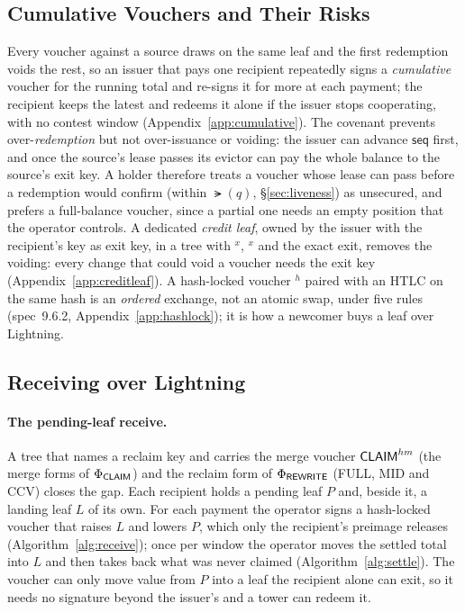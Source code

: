 \subsection{Cumulative Vouchers and Their Risks}\label{sec:cumulative}

Every voucher against a source draws on the same leaf and the first
redemption voids the rest, so an issuer that pays one recipient repeatedly
signs a \emph{cumulative} voucher for the running total and re-signs it for
more at each payment; the recipient keeps the latest and redeems it alone
if the issuer stops cooperating, with no contest window
(Appendix~\ref{app:cumulative}).\label{sec:holder-risk} The covenant
prevents over-\emph{redemption} but not over-issuance or voiding: the
issuer can advance $\mathsf{seq}$ first, and once the source's lease
passes its evictor can pay the whole balance to the source's exit key. A
holder therefore treats a voucher whose lease can pass before a redemption
would confirm (within $\lat(q)$, \S\ref{sec:liveness}) as unsecured, and
prefers a full-balance voucher, since a partial one needs an empty
position that the operator controls.\label{sec:creditleaf} A dedicated
\emph{credit leaf}, owned by the issuer with the recipient's key as exit
key, in a tree with $^{x}$, $^{x}$ and the exact
exit, removes the voiding: every change that could void a voucher needs
the exit key (Appendix~\ref{app:creditleaf}).\label{sec:hashlock} A
hash-locked voucher $^{h}$ paired with an HTLC on the same hash
is an \emph{ordered} exchange, not an atomic swap, under five rules
(spec~9.6.2, Appendix~\ref{app:hashlock}); it is how a newcomer buys a leaf
over Lightning.

\subsection{Receiving over Lightning}\label{sec:receive-short}



\paragraph{The pending-leaf receive.} A tree that names a reclaim
key and carries the merge voucher $\textsf{CLAIM}^{hm}$ (the merge forms of
$\Phi_{\textsf{CLAIM}}$) and the reclaim form of $\Phi_{\textsf{REWRITE}}$ (FULL,
MID and CCV) closes the gap. Each recipient holds a pending leaf $P$ and,
beside it, a landing leaf $L$ of its own. For each payment the operator
signs a hash-locked voucher that raises $L$ and lowers $P$, which only the
recipient's preimage releases (Algorithm~\ref{alg:receive}); once per
window the operator moves the settled total into $L$ and then takes back
what was never claimed (Algorithm~\ref{alg:settle}). The voucher can only
move value from $P$ into a leaf the recipient alone can exit, so it needs
no signature beyond the issuer's and a tower can redeem it.

